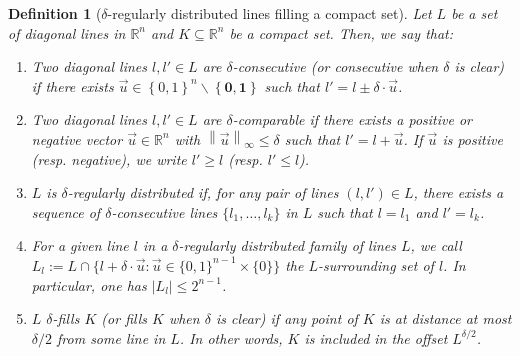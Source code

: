 \documentclass{article}
\newcommand{\norm}[1]{\left\lVert #1 \right\rVert}
\newcommand{\R}{\mathbb{R}}
\DeclareRobustCommand*{\ora}{\overrightarrow}
\newtheorem{definition}{Definition}%
\begin{document}
\begin{definition}[$\delta$-regularly distributed lines filling a compact set]\label{def:regularly_distributed}
	Let $L$ be a set of diagonal lines in $\R^n$ and $K\subseteq \R^n$ be a compact set.
	Then, we say that:
	\begin{enumerate}
		\item Two diagonal lines $l, l' \in L$ are $\delta$-\emph{consecutive} (or {\em consecutive} when $\delta$ is clear) if there exists ${\ora u} \in \left\{ 0,1\right\}^n \backslash \left\{ \mathbf{0},\mathbf{1}\right\}$
		such that $l' = l \pm \delta\cdot {\ora u}$. %
		\item Two diagonal lines $l, l' \in L$ are
		$\delta$-\emph{comparable} if there exists a positive or negative vector $\ora u\in\R^n$ 
		with $\norm{\ora u}_\infty \le \delta$ such
		that $l' = l + \ora u$.
		If $\ora u$ is positive (resp. negative), we write $l'\ge l$ (resp. $l'\le l$).
		\item $L$ is $\delta$-\emph{regularly distributed} if, for any pair of lines $(l,l')\in L$, there exists a sequence of $\delta$-consecutive lines $\{l_1, \dots, l_k\}$ in $L$ such that $l = l_1$ and $l'=l_k$.
		\item For a given line $l$ in a $\delta$-regularly distributed family of lines $L$, we call
		$L_l:=L\cap\{l+\delta\cdot \ora u: \ora u\in \{0,1\}^{n-1}\times \{0\}\}$
		the {\em $L$-surrounding set} of $l$. In particular, one has $|L_l| \le 2^{n-1}$.
		\item $L$ $\delta$-\emph{fills} $K$ (or {\em fills} $K$ when $\delta$ is clear)
		if any point of $K$ is at distance at most $ \delta/2$ from some line in $L$.
		In other words, $K$ is included in the offset $L^{\delta/2}$. \\ %
	\end{enumerate}
\end{definition}





	
	
	
\end{document}
